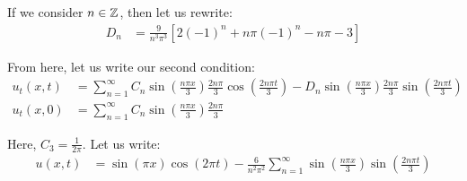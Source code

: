 \documentclass{article}
\begin{document}
\begin{enumerate}
\begin{enumerate}
     If we consider $n \in \mathbb Z$, then let us rewrite:
     \begin{align}
       D_n & = \frac{9}{n^3 \pi^3} \left[ 2 (-1)^n + n \pi (-1)^n - n \pi - 3\right]
     \end{align}

     From here, let us write our second condition:
     \begin{align}
       u_t(x, t) & =
       \sum^\infty_{n = 1}
       C_n
       \sin \left( \frac{n \pi x}{3} \right)
       \frac{2 n \pi}{3}
       \cos \left( \frac{2 n \pi t}{3} \right) -
       D_n
       \sin \left( \frac{n \pi x}{3} \right)
       \frac{2 n \pi}{3}
       \sin \left( \frac{2 n \pi t}{3} \right)\\
       u_t(x, 0) & =
       \sum^\infty_{n = 1}
       C_n
       \sin \left( \frac{n \pi x}{3} \right)
       \frac{2 n \pi}{3}
     \end{align}

     Here, $C_3 = \frac{1}{2 \pi}$. Let us write:
     \begin{align}
       u(x, t) & =
       \sin(\pi x) \cos(2 \pi t) -
       \frac{6}{n^2 \pi^2}
       \sum^\infty_{n = 1}
       \sin\left( \frac{n \pi x}{3} \right) \sin\left(\frac{2 n \pi t}{3}\right)
     \end{align}


  \end{enumerate}

%
%

\end{enumerate}
\end{document}
